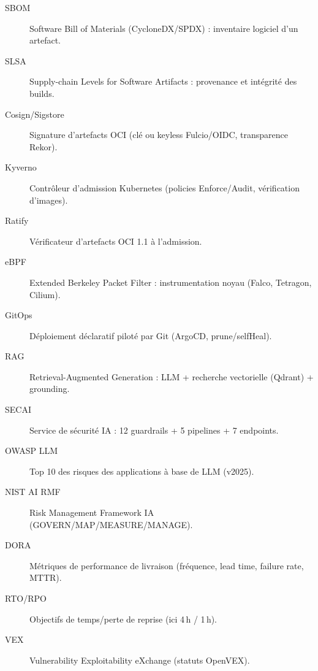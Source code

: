 \documentclass[12pt,a4paper,openany]{report}
\begin{document}
\begin{description}
  \item[SBOM] Software Bill of Materials (CycloneDX/SPDX) : inventaire logiciel d'un artefact.
  \item[SLSA] Supply-chain Levels for Software Artifacts : provenance et intégrité des builds.
  \item[Cosign/Sigstore] Signature d'artefacts OCI (clé ou keyless Fulcio/OIDC, transparence Rekor).
  \item[Kyverno] Contrôleur d'admission Kubernetes (policies Enforce/Audit, vérification d'images).
  \item[Ratify] Vérificateur d'artefacts OCI 1.1 à l'admission.
  \item[eBPF] Extended Berkeley Packet Filter : instrumentation noyau (Falco, Tetragon, Cilium).
  \item[GitOps] Déploiement déclaratif piloté par Git (ArgoCD, prune/selfHeal).
  \item[RAG] Retrieval-Augmented Generation : LLM + recherche vectorielle (Qdrant) + grounding.
  \item[SECAI] Service de sécurité IA : 12 guardrails + 5 pipelines + 7 endpoints.
  \item[OWASP LLM] Top 10 des risques des applications à base de LLM (v2025).
  \item[NIST AI RMF] Risk Management Framework IA (GOVERN/MAP/MEASURE/MANAGE).
  \item[DORA] Métriques de performance de livraison (fréquence, lead time, failure rate, MTTR).
  \item[RTO/RPO] Objectifs de temps/perte de reprise (ici 4\,h / 1\,h).
  \item[VEX] Vulnerability Exploitability eXchange (statuts OpenVEX).
\end{description}
\end{document}
